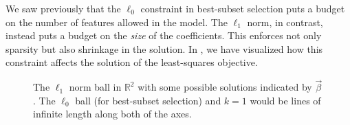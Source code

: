 We saw previously that the \(\ell_0\) constraint in best-subset selection puts a budget on the number of features allowed in the model. The \(\ell_1\) norm, in contrast, instead puts a budget on the \emph{size} of the coefficients. This enforces not only sparsity but also shrinkage in the solution. In , we have visualized how this constraint affects the solution of the least-squares objective.

\begin{figure}
  \centering
  \hfill%
  \hfill%

  \caption{%
    The \(\ell_1\) norm ball in \(\mathbb{R}^2\) with some possible solutions indicated by \(\vec{\beta}\). The \(\ell_0\) ball (for best-subset selection) and \(k = 1\) would be lines of infinite length along both of the axes.
  }
  \label{fig:lasso-ball}
\end{figure}

